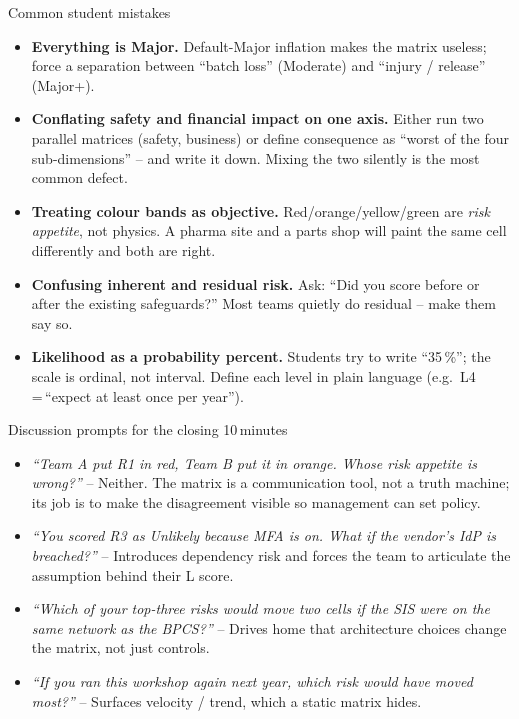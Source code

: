 \documentclass[11pt,a4paper]{article}
\begin{document}
\begin{solutionbox}{Common student mistakes}
\begin{itemize}[leftmargin=*, nosep]
  \item \textbf{Everything is Major.} Default-Major inflation makes the matrix useless; force a separation between ``batch loss'' (Moderate) and ``injury / release'' (Major+).
  \item \textbf{Conflating safety and financial impact on one axis.} Either run two parallel matrices (safety, business) or define consequence as ``worst of the four sub-dimensions'' -- and write it down. Mixing the two silently is the most common defect.
  \item \textbf{Treating colour bands as objective.} Red/orange/yellow/green are \emph{risk appetite}, not physics. A pharma site and a parts shop will paint the same cell differently and both are right.
  \item \textbf{Confusing inherent and residual risk.} Ask: ``Did you score before or after the existing safeguards?'' Most teams quietly do residual -- make them say so.
  \item \textbf{Likelihood as a probability percent.} Students try to write ``35\,\%''; the scale is ordinal, not interval. Define each level in plain language (e.g.\ L4\,=\,``expect at least once per year'').
\end{itemize}
\end{solutionbox}

\begin{solutionbox}{Discussion prompts for the closing 10\,minutes}
\begin{itemize}[leftmargin=*, nosep]
  \item \emph{``Team A put R1 in red, Team B put it in orange. Whose risk appetite is wrong?''} -- Neither. The matrix is a communication tool, not a truth machine; its job is to make the disagreement visible so management can set policy.
  \item \emph{``You scored R3 as Unlikely because MFA is on. What if the vendor's IdP is breached?''} -- Introduces dependency risk and forces the team to articulate the assumption behind their L score.
  \item \emph{``Which of your top-three risks would move two cells if the SIS were on the same network as the BPCS?''} -- Drives home that architecture choices change the matrix, not just controls.
  \item \emph{``If you ran this workshop again next year, which risk would have moved most?''} -- Surfaces velocity / trend, which a static matrix hides.
\end{itemize}
\end{solutionbox}
\end{document}

